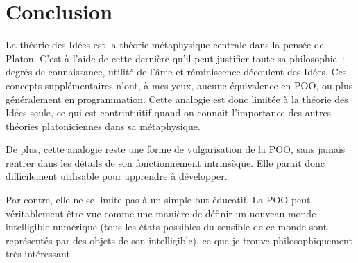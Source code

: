 \documentclass[a4paper, titlepage, 12pt]{article}
\begin{document}
	\newpage
	\section{Conclusion}
	La théorie des Idées est la théorie métaphysique centrale dans la pensée de Platon. C'est à l'aide de cette dernière qu'il peut justifier toute sa philosophie~: degrés de connaissance, utilité de l'âme et réminiscence découlent des Idées. Ces concepts supplémentaires n'ont, à mes yeux, aucune équivalence en POO, ou plus généralement en programmation. Cette analogie est donc limitée à la théorie des Idées seule, ce qui est contrintuitif quand on connait l'importance des autres théories platoniciennes dans sa métaphysique.

	De plus, cette analogie reste une forme de vulgarisation de la POO, sans jamais rentrer dans les détails de son fonctionnement intrinsèque. Elle parait donc difficilement utilisable pour apprendre à développer.

	Par contre, elle ne se limite pas à un simple but éducatif. La POO peut véritablement être vue comme une manière de définir un nouveau monde intelligible numérique (tous les états possibles du sensible de ce monde sont représentés par des objets de son intelligible), ce que je trouve philosophiquement très intéressant.
	
	\newpage
	
	
\end{document}
